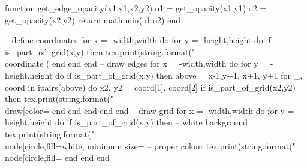 \begin{luacode}
function get_edge_opacity(x1,y1,x2,y2)
	o1 = get_opacity(x1,y1)
	o2 = get_opacity(x2,y2)
	return math.min(o1,o2)
end

-- define coordinates
for x = -width,width do
	for y = -height,height do
		if is_part_of_grid(x,y) then
			tex.print(string.format("\\coordinate (%
		end
	end 
end 
-- draw edges
for x = -width,width do
	for y = -height,height do
		if is_part_of_grid(x,y) then
			above = {{x-1,y+1}, {x+1, y+1}}
			for _, coord in ipairs(above) do 
				x2, y2 = coord[1], coord[2]
				if is_part_of_grid(x2,y2) then
					tex.print(string.format("\\draw[color=%
				end
			end
		end
	end 
end 
-- draw grid
for x = -width,width do
	for y = -height,height do
		if is_part_of_grid(x,y) then
			-- white background
			tex.print(string.format("\\node[circle,fill=white, minimum size=%
			-- proper colour
			tex.print(string.format("\\node[circle,fill=%
		end
	end 
end 

\end{luacode}